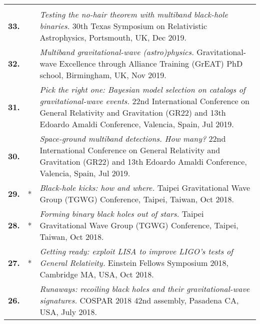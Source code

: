 \documentclass[11pt,letterpaper,sans]{moderncv}   %
\begin{document}
{\begin{longtable}{rp{0.4cm}p{15.8cm}}
\vspace{0.05cm}\\
%
\textbf{33.} & & \textit{Testing the no-hair theorem with multiband black-hole binaries.}
\newline{}30th Texas Symposium on Relativistic Astrophysics, Portsmouth, UK, Dec 2019.
\vspace{0.05cm}\\
%
\textbf{32.} & & \textit{Multiband gravitational-wave (astro)physics.}
\newline{} Gravitational-wave Excellence through Alliance Training (GrEAT) PhD school, Birmingham, UK, Nov 2019.
\vspace{0.05cm}\\
%
\textbf{31.} & & \textit{Pick the right one: Bayesian model selection on catalogs of gravitational-wave events.}
\newline{} 22nd International Conference on General Relativity and Gravitation (GR22)  and 13th Edoardo Amaldi Conference, Valencia, Spain, Jul 2019.
\vspace{0.05cm}\\
%
\textbf{30.} & & \textit{Space-ground multiband detections. How many?}
\newline{} 22nd International Conference on General Relativity and Gravitation (GR22)  and 13th Edoardo Amaldi Conference, Valencia, Spain, Jul 2019.
\vspace{0.05cm}\\
%
\textbf{29.} & * & \textit{Black-hole kicks: how and where.}
\newline{} Taipei Gravitational Wave Group (TGWG) Conference, Taipei, Taiwan, Oct 2018.
\vspace{0.05cm}\\
%
\textbf{28.} & * & \textit{Forming binary black holes out of stars.}
\newline{} Taipei Gravitational Wave Group (TGWG) Conference, Taipei, Taiwan, Oct 2018.
\vspace{0.05cm}\\
%
\textbf{27.} & * & \textit{Getting ready: exploit LISA to improve LIGO's tests of General Relativity.}
\newline{} Einstein Fellows Symposium 2018, Cambridge MA, USA, Oct 2018.
\vspace{0.05cm}\\
%
\textbf{26.} & & \textit{Runaways: recoiling black holes and their gravitational-wave signatures.}
\newline{} COSPAR 2018 42nd assembly, Pasadena CA, USA, July 2018.

\end{longtable}}
\end{document}
